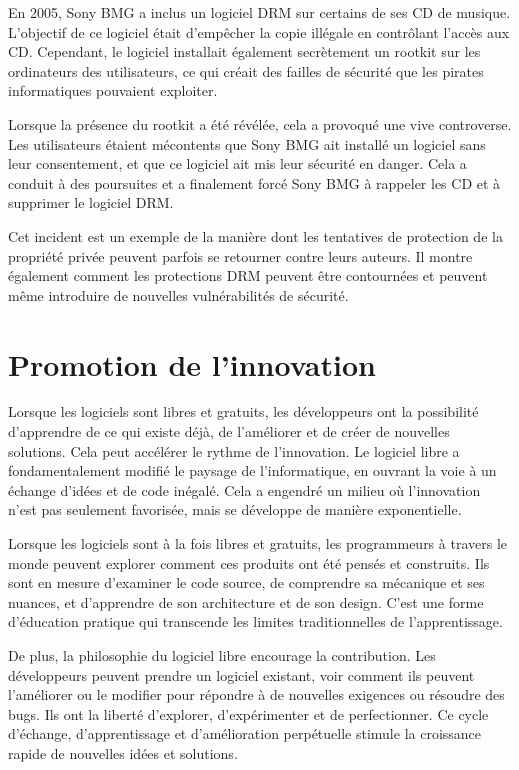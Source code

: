 En 2005, Sony BMG a inclus un logiciel DRM sur certains de ses CD de musique. L'objectif de ce logiciel était d'empêcher la copie illégale en contrôlant l'accès aux CD. Cependant, le logiciel installait également secrètement un rootkit sur les ordinateurs des utilisateurs, ce qui créait des failles de sécurité que les pirates informatiques pouvaient exploiter.

Lorsque la présence du rootkit a été révélée, cela a provoqué une vive controverse. Les utilisateurs étaient mécontents que Sony BMG ait installé un logiciel sans leur consentement, et que ce logiciel ait mis leur sécurité en danger. Cela a conduit à des poursuites et a finalement forcé Sony BMG à rappeler les CD et à supprimer le logiciel DRM.

Cet incident est un exemple de la manière dont les tentatives de protection de la propriété privée peuvent parfois se retourner contre leurs auteurs. Il montre également comment les protections DRM peuvent être contournées et peuvent même introduire de nouvelles vulnérabilités de sécurité. \cite{halderman2006lessons}


\section{Promotion de l'innovation} Lorsque les logiciels sont libres et gratuits, les développeurs ont la possibilité d'apprendre de ce qui existe déjà, de l'améliorer et de créer de nouvelles solutions. Cela peut accélérer le rythme de l'innovation.
Le logiciel libre a fondamentalement modifié le paysage de l'informatique, en ouvrant la voie à un échange d'idées et de code inégalé. Cela a engendré un milieu où l'innovation n'est pas seulement favorisée, mais se développe de manière exponentielle.

Lorsque les logiciels sont à la fois libres et gratuits, les programmeurs à travers le monde peuvent explorer comment ces produits ont été pensés et construits. Ils sont en mesure d'examiner le code source, de comprendre sa mécanique et ses nuances, et d'apprendre de son architecture et de son design. C'est une forme d'éducation pratique qui transcende les limites traditionnelles de l'apprentissage.

De plus, la philosophie du logiciel libre encourage la contribution. Les développeurs peuvent prendre un logiciel existant, voir comment ils peuvent l'améliorer ou le modifier pour répondre à de nouvelles exigences ou résoudre des bugs. Ils ont la liberté d'explorer, d'expérimenter et de perfectionner. Ce cycle d'échange, d'apprentissage et d'amélioration perpétuelle stimule la croissance rapide de nouvelles idées et solutions.

